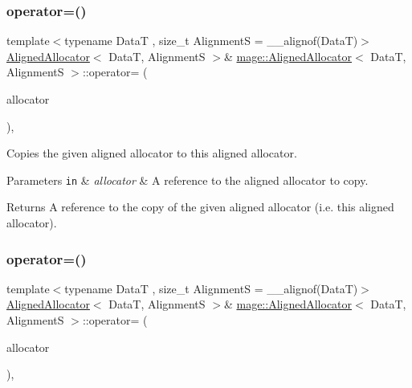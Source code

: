 \subsubsection{\texorpdfstring{operator=()}{operator=()}\hspace{0.1cm}{\footnotesize\ttfamily [1/2]}}
{\footnotesize\ttfamily template$<$typename DataT , size\+\_\+t AlignmentS = \+\_\+\+\_\+alignof(\+Data\+T)$>$ \\
\hyperlink{structmage_1_1_aligned_allocator}{Aligned\+Allocator}$<$ DataT, AlignmentS $>$\& \hyperlink{structmage_1_1_aligned_allocator}{mage\+::\+Aligned\+Allocator}$<$ DataT, AlignmentS $>$\+::operator= (\begin{DoxyParamCaption}\item[{const \hyperlink{structmage_1_1_aligned_allocator}{Aligned\+Allocator}$<$ DataT, AlignmentS $>$ \&}]{allocator }\end{DoxyParamCaption})\hspace{0.3cm}{\ttfamily [delete]}, {\ttfamily [noexcept]}}

Copies the given aligned allocator to this aligned allocator.


\begin{DoxyParams}[1]{Parameters}
\mbox{\tt in}  & {\em allocator} & A reference to the aligned allocator to copy. \\
\hline
\end{DoxyParams}
\begin{DoxyReturn}{Returns}
A reference to the copy of the given aligned allocator (i.\+e. this aligned allocator). 
\end{DoxyReturn}
\hypertarget{structmage_1_1_aligned_allocator_a968996d679acfd7ce9d113bf33d31c91}{}\label{structmage_1_1_aligned_allocator_a968996d679acfd7ce9d113bf33d31c91} 
\subsubsection{\texorpdfstring{operator=()}{operator=()}\hspace{0.1cm}{\footnotesize\ttfamily [2/2]}}
{\footnotesize\ttfamily template$<$typename DataT , size\+\_\+t AlignmentS = \+\_\+\+\_\+alignof(\+Data\+T)$>$ \\
\hyperlink{structmage_1_1_aligned_allocator}{Aligned\+Allocator}$<$ DataT, AlignmentS $>$\& \hyperlink{structmage_1_1_aligned_allocator}{mage\+::\+Aligned\+Allocator}$<$ DataT, AlignmentS $>$\+::operator= (\begin{DoxyParamCaption}\item[{\hyperlink{structmage_1_1_aligned_allocator}{Aligned\+Allocator}$<$ DataT, AlignmentS $>$ \&\&}]{allocator }\end{DoxyParamCaption})\hspace{0.3cm}{\ttfamily [delete]}, {\ttfamily [noexcept]}}


